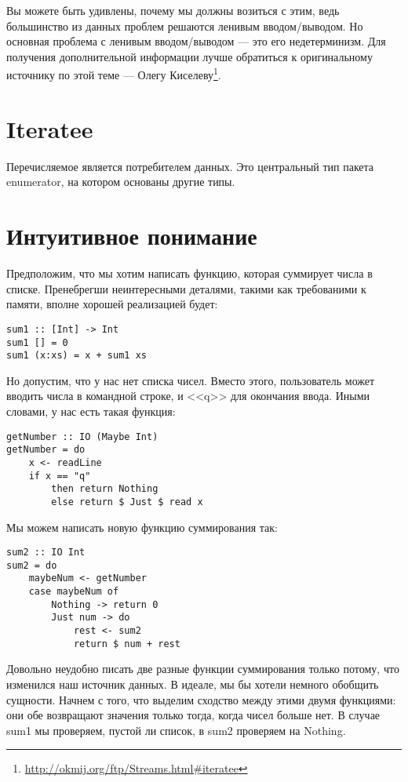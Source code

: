 \begin{remark}
Вы можете быть удивлены, почему мы должны возиться с этим, ведь большинство из данных проблем решаются ленивым вводом/выводом. Но основная проблема с ленивым вводом/выводом --- это его недетерминизм. Для получения дополнительной информации лучше обратиться к оригинальному источнику по этой теме --- Олегу Киселеву\footnote{\href{http://okmij.org/ftp/Streams.html\#iteratee}{http://okmij.org/ftp/Streams.html\#iteratee}}.
\end{remark}

\section{Iteratee}

Перечисляемое является потребителем данных. Это центральный тип пакета enumerator, на котором основаны другие типы.

\section{Интуитивное понимание}

Предположим, что мы хотим написать функцию, которая суммирует числа в списке. Пренебрегши неинтересными деталями, такими как требованими к памяти, вполне хорошей реализацией будет:

\begin{lstlisting}
sum1 :: [Int] -> Int
sum1 [] = 0
sum1 (x:xs) = x + sum1 xs
\end{lstlisting}

Но допустим, что у нас нет списка чисел. Вместо этого, пользователь может вводить числа в командной строке, и <<q>> для окончания ввода. Иными словами, у нас есть такая функция:

\begin{lstlisting}
getNumber :: IO (Maybe Int)
getNumber = do
    x <- readLine
    if x == "q"
        then return Nothing
        else return $ Just $ read x
\end{lstlisting}%

Мы можем написать новую функцию суммирования так:

\begin{lstlisting}
sum2 :: IO Int
sum2 = do
    maybeNum <- getNumber
    case maybeNum of
        Nothing -> return 0
        Just num -> do
            rest <- sum2
            return $ num + rest
\end{lstlisting}%

Довольно неудобно писать две разные функции суммирования только потому, что изменился наш источник данных. В идеале, мы бы хотели немного обобщить сущности. Начнем с того, что выделим сходство между этими двумя функциями: они обе возвращают значения только тогда, когда чисел больше нет. В случае sum1 мы проверяем, пустой ли список, в sum2 проверяем на Nothing.

